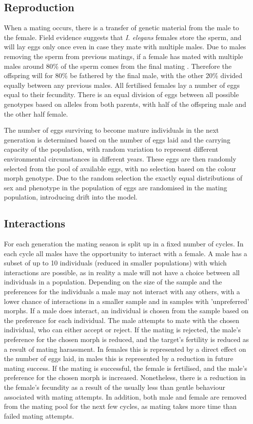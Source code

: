 \documentclass{article}
\begin{document}
\subsection{Reproduction}
When a mating occurs, there is a transfer of genetic material from the male to the female. Field evidence suggests that \textit{I. elegans} females store the sperm, and will lay eggs only once even in case they mate with multiple males. Due to males removing the sperm from previous matings, if a female has mated with multiple males around 80\% of the sperm comes from the final mating \cite{Cooper1996, Cordoba2003}. Therefore the offspring will for 80\% be fathered by the final male, with the other 20\% divided equally between any previous males. All fertilised females lay a number of eggs equal to their fecundity. There is an equal division of eggs between all possible genotypes based on alleles from both parents, with half of the offspring male and the other half female.

The number of eggs surviving to become mature individuals in the next generation is determined based on the number of eggs laid and the carrying capacity of the population, with random variation to represent different environmental circumstances in different years. These eggs are then randomly selected from the pool of available eggs, with no selection based on the colour morph genotype. Due to the random selection the exactly equal distributions of sex and phenotype in the population of eggs are randomised in the mating population, introducing drift into the model.

\subsection{Interactions}
For each generation the mating season is split up in a fixed number of cycles. In each cycle all males have the opportunity to interact with a female. A male has a subset of up to 10 individuals (reduced in smaller populations) with which interactions are possible, as in reality a male will not have a choice between all individuals in a population. Depending on the size of the sample and the preferences for the individuals a male may not interact with any others, with a lower chance of interactions in a smaller sample and in samples with 'unpreferred' morphs. If a male does interact, an individual is chosen from the sample based on the preference for each individual. The male attempts to mate with the chosen individual, who can either accept or reject. If the mating is rejected, the male's preference for the chosen morph is reduced, and the target's fertility is reduced as a result of mating harassment. In females this is represented by a direct effect on the number of eggs laid, in males this is represented by a reduction in future mating success. If the mating is successful, the female is fertilised, and the male's preference for the chosen morph is increased. Nonetheless, there is a reduction in the female's fecundity as a result of the usually less than gentle behaviour associated with mating attempts. In addition, both male and female are removed from the mating pool for the next few cycles, as mating takes more time than failed mating attempts.
\end{document}
